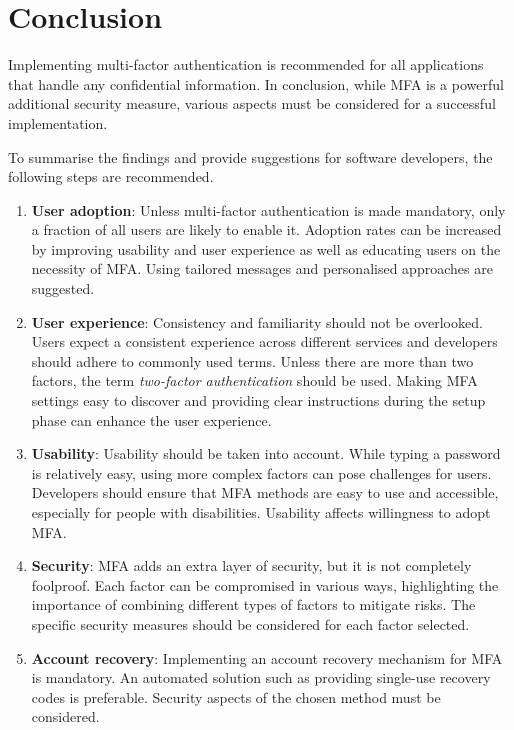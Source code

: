 \chapter{Conclusion\label{ch:conclusions}}

Implementing multi-factor authentication is recommended for all applications that handle any confidential information. In conclusion, while MFA is a powerful additional security measure, various aspects must be considered for a successful implementation.

To summarise the findings and provide suggestions for software developers, the following steps are recommended.

\begin{enumerate}
    \item \textbf{User adoption}: Unless multi-factor authentication is made mandatory, only a fraction of all users are likely to enable it. Adoption rates can be increased by improving usability and user experience as well as educating users on the necessity of MFA. Using tailored messages and personalised approaches are suggested.

    \item \textbf{User experience}: Consistency and familiarity should not be overlooked. Users expect a consistent experience across different services and developers should adhere to commonly used terms. Unless there are more than two factors, the term \textit{two-factor authentication} should be used. Making MFA settings easy to discover and providing clear instructions during the setup phase can enhance the user experience.

    \item \textbf{Usability}: Usability should be taken into account. While typing a password is relatively easy, using more complex factors can pose challenges for users. Developers should ensure that MFA methods are easy to use and accessible, especially for people with disabilities. Usability affects willingness to adopt MFA.

    \item \textbf{Security}: MFA adds an extra layer of security, but it is not completely foolproof. Each factor can be compromised in various ways, highlighting the importance of combining different types of factors to mitigate risks. The specific security measures should be considered for each factor selected.

    \item \textbf{Account recovery}: Implementing an account recovery mechanism for MFA is mandatory. An automated solution such as providing single-use recovery codes is preferable. Security aspects of the chosen method must be considered.
\end{enumerate}
